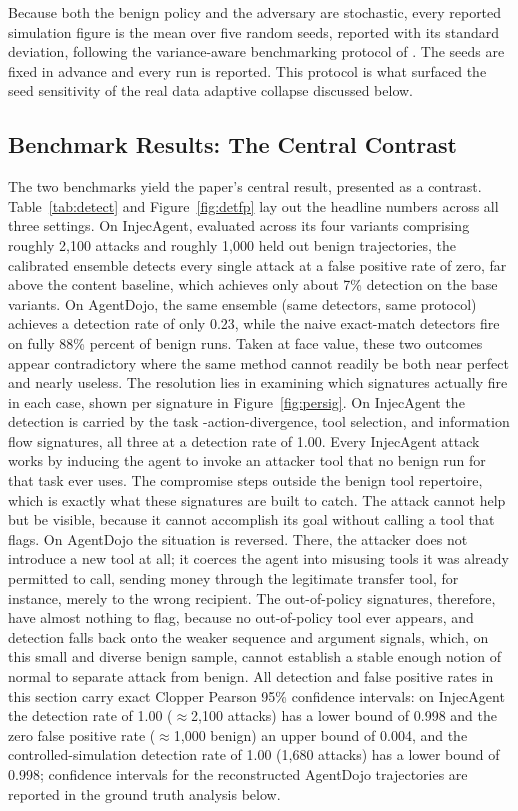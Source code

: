 \documentclass[journal]{IEEEtran}
\theoremstyle{remark}
\begin{document}
Because both the benign policy and the adversary are stochastic, every reported simulation figure is the mean over five random seeds, reported with its standard deviation, following the variance-aware benchmarking protocol of \cite{r31}. The seeds are fixed in advance and every run is reported. This protocol is what surfaced the seed sensitivity of the real data adaptive collapse discussed below.

\subsection{Benchmark Results: The Central Contrast}
The two benchmarks yield the paper's central result, presented as a contrast. Table~\ref{tab:detect} and Figure~\ref{fig:detfp} lay out the headline numbers across all three settings. 
On InjecAgent, evaluated across its four variants comprising roughly 2,100 attacks and roughly 1,000 held out benign trajectories, the calibrated ensemble detects every single attack at a false positive rate of zero, far above the content baseline, which achieves only about 7\% detection on the base variants. On AgentDojo, the same ensemble (same detectors, same protocol) achieves a detection rate of only 0.23, while the naive exact-match detectors fire on fully  88\%  percent of benign runs. Taken at face value, these two outcomes appear contradictory where the same method cannot readily be both near perfect and nearly useless. The resolution lies in examining which signatures actually fire in each case, shown per signature in Figure~\ref{fig:persig}. On InjecAgent the detection is carried by the task -action-divergence, tool selection, and information flow signatures, all three at a detection rate of 1.00. Every InjecAgent attack works by inducing the agent to invoke an attacker tool that no benign run for that task ever uses. The compromise steps outside the benign tool repertoire, which is exactly what these signatures are built to catch. The attack cannot help but be visible, because it cannot accomplish its goal without calling a tool that flags. On AgentDojo the situation is reversed. There, the attacker does not introduce a new tool at all; it coerces the agent into misusing tools it was already permitted to call, sending money through the legitimate transfer tool, for instance, merely to the wrong recipient. The out-of-policy signatures, therefore, have almost nothing to flag, because no out-of-policy tool ever appears, and detection falls back onto the weaker sequence and argument signals, which, on this small and diverse benign sample, cannot establish a stable enough notion of normal to separate attack from benign. All detection and false positive rates in this section carry exact Clopper  Pearson 95\% confidence intervals: on InjecAgent the detection rate of 1.00 ($\approx$2,100 attacks) has a lower bound of 0.998 and the zero false positive rate ($\approx$1,000 benign) an upper bound of 0.004, and the controlled-simulation detection rate of 1.00 (1,680 attacks) has a lower bound of 0.998; confidence intervals for the reconstructed AgentDojo trajectories are reported in the ground truth analysis below.
\end{document}
